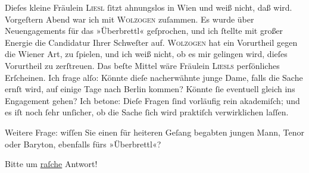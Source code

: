 \pstart
           Dieſes kleine Fräulein \textsc{Liesl} ſitzt ahnungslos in Wien und weiß nicht, daß
                  \label{K_L03525-5v}\label{K_L03525-5} wird. Vorgeſtern{ }Abend war ich mit \textsc{Wolzogen} zuſammen. Es wurde über Neuengagements für das »Überbrettl« geſprochen, und ich ſtellte mit großer Energie die Candidatur
               Ihrer Schweſter auf. \textsc{Wolzogen} hat ein Vorurtheil gegen die Wiener Art, zu
               ſpielen, und ich weiß nicht, ob es mir gelingen wird, dieſes Vorurtheil zu
               zerſtreuen. Das beſte Mittel wäre Fräulein \textsc{Liesls} perſönliches Erſcheinen. Ich
               frage alſo: Könnte dieſe {\pb}nacherwähnte junge Dame, falls die Sache ernſt
               wird, auf einige Tage nach Berlin kommen? Könnte
               ſie eventuell gleich ins Engagement gehen? Ich betone: Dieſe Fragen ſind vorläufig rein akademiſch;
               und es iſt noch ſehr unſicher, ob die Sache ſich wird praktiſch verwirklichen
               laſſen.\pend
           
\pstart
           Weitere Frage: wiſſen Sie einen für heiteren Geſang begabten jungen Mann, {\pb}Tenor oder Baryton, ebenfalls fürs »Überbrettl«?\pend
           
\pstart
           Bitte um \uline{raſche} Antwort!\pend
           
